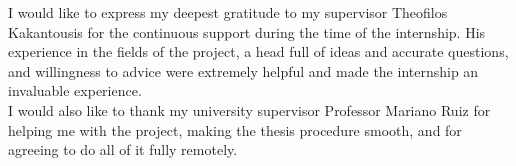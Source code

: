 I would like to express my deepest gratitude to my supervisor Theofilos Kakantousis for the continuous support during the time of the internship.
His experience in the fields of the project, a head full of ideas and accurate questions, and willingness to advice were extremely helpful and made the internship an invaluable experience.\\
I would also like to thank my university supervisor Professor Mariano Ruiz for helping me with the project, making the thesis procedure smooth, and for agreeing to do all of it fully remotely.